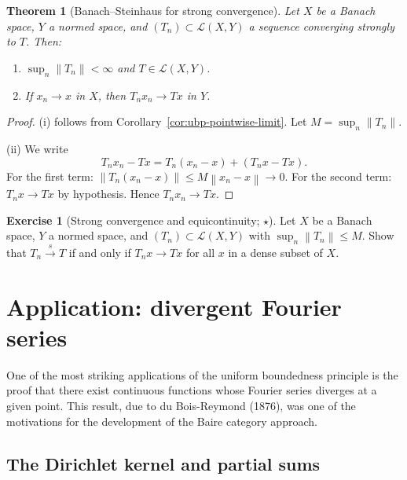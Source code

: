 \documentclass[a4paper,12pt]{book}
\newcommand{\norm}[1]{\left\| #1 \right\|}
\theoremstyle{definition}
\newtheorem{exercise}{Exercise}[chapter]
\theoremstyle{plain}
\newtheorem{theorem}[definition]{Theorem}
\theoremstyle{remark}
\begin{document}
\begin{theorem}[Banach--Steinhaus for strong convergence]%
\label{thm:bs-strong-convergence}
Let $X$ be a Banach space, $Y$ a normed space, and $(T_n) \subset \mathcal{L}(X,Y)$
a sequence converging strongly to $T$. Then:
\begin{enumerate}[label=(\roman*)]
  \item $\sup_n \norm{T_n} < \infty$ and $T \in \mathcal{L}(X,Y)$.
  \item If $x_n \to x$ in $X$, then $T_n x_n \to Tx$ in $Y$.
\end{enumerate}
\end{theorem}

\begin{proof}
(i) follows from Corollary~\ref{cor:ubp-pointwise-limit}. Let $M = \sup_n \norm{T_n}$.

(ii) We write
\[
  T_n x_n - Tx = T_n(x_n - x) + (T_n x - Tx).
\]
For the first term: $\norm{T_n(x_n - x)} \leq M \norm{x_n - x} \to 0$.
For the second term: $T_n x \to Tx$ by hypothesis. Hence $T_n x_n \to Tx$.
\end{proof}

\begin{exercise}[Strong convergence and equicontinuity; $\star$]%
\label{ex:strong-equicontinuous}
Let $X$ be a Banach space, $Y$ a normed space, and $(T_n) \subset \mathcal{L}(X,Y)$
with $\sup_n \norm{T_n} \leq M$. Show that $T_n \xrightarrow{s} T$ if and only if
$T_n x \to Tx$ for all $x$ in a dense subset of $X$.
\end{exercise}

\section{Application: divergent Fourier series}\label{sec:dubois-reymond}

One of the most striking applications of the uniform boundedness principle is the
proof that there exist continuous functions whose Fourier series diverges at a
given point. This result, due to du Bois-Reymond (1876),
was one of the motivations for the development of the Baire category approach.

\subsection{The Dirichlet kernel and partial sums}\label{subsec:dirichlet-kernel}
\end{document}
